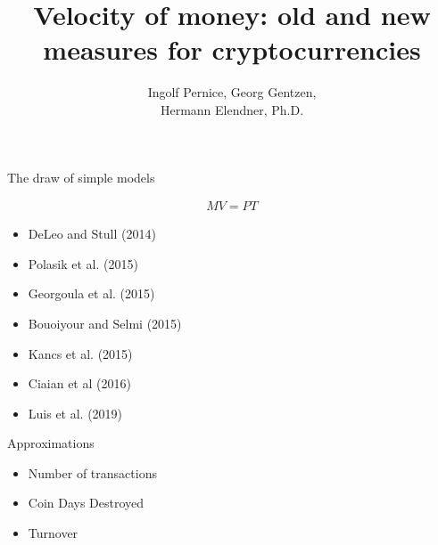 \documentclass[]{beamer}
\begin{document}
\title{Velocity of money: old and new measures for cryptocurrencies}
\author[]{Ingolf Pernice, Georg Gentzen,\\ Hermann Elendner, Ph.D.}



\maketitle



\begin{frame}{The draw of simple models}
  \vfill

  
  \begin{align*}
    MV=PT
  \end{align*}

  \begin{itemize}
  \item DeLeo and Stull (2014) 
  \item Polasik et al. (2015) 
  \item Georgoula et al. (2015) 
  \item Bouoiyour and Selmi (2015) 
  \item Kancs et al. (2015) 
  \item Ciaian et al (2016) \visible<2->{\deemphtext{-- No.}}
  \item Luis et al. (2019) 
    
  \end{itemize}
  
  \vfill


\end{frame}


\begin{frame}{Approximations}
  
  \begin{itemize}
  \item Number of transactions \linebreak[1]
  \item Coin Days Destroyed \linebreak[1]
  \item Turnover \linebreak[1]
  \end{itemize}
  
\end{frame}
\end{document}
